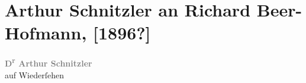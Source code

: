 

         
         \renewcommand{\erwaehntePersonen}{Personen: Richard Beer-Hofmann}
         \renewcommand{\erwaehnteWerke}{}
               \section[Arthur Schnitzler an Richard Beer-Hofmann, {[}1896?{]}]{ Arthur Schnitzler an Richard Beer-Hofmann, {[}1896?{]}}\nopagebreak{}\rehead{ }\begin{ledgroupsized}[t]{13cm}\normalsize\beginnumbering \toendnotes[C]{\smallbreak\pagebreak[2]} 
\toendnotes[C]{\smallbreak}\pstart
           \noindent{}\centering{}{\pb}\textcolor{gray}{\textbf{D\textsuperscript{r} Arthur Schnitzler}}\pend
           \pstart
           \noindent{}\centering{}\label{K_L00526_1v}\label{K_L00526_1h}{\\}auf Wiederſehen\pend
           
         
         \endnumbering{}\end{ledgroupsized}  \newcommand{\dateiname}{L00526}\newcommand{\titel}{Arthur Schnitzler an Richard Beer-Hofmann, [1896?]}\newcommand{\editorInnen}{Martin Anton Müller und Gerd-Hermann Susen}
      